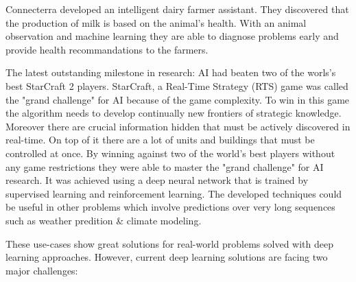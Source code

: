 Connecterra developed an intelligent dairy farmer assistant.
They discovered that the production of milk is based on the animal’s health.
With an animal observation and machine learning they are able to diagnose problems early and provide health recommandations to the farmers.
\cite{tensorflow-stories, connecterra-video, connecterra-web}

The latest outstanding milestone in research: AI had beaten two of the worls's best StarCraft 2 players.
StarCraft, a Real-Time Strategy (RTS) game was called the "grand challenge" for AI because of the game complexity.
To win in this game the algorithm needs to develop continually new frontiers of strategic knowledge.
Moreover there are crucial information hidden that must be actively discovered in real-time. On top of it there are a lot of units and buildings that must be controlled at once.
By winning against two of the world's best players without any game restrictions they were able to master the "grand challenge" for AI research.
It was achieved using a deep neural network that is trained by supervised learning and reinforcement learning.
The developed techniques could be useful in other problems which involve predictions over very long sequences such as weather predition \& climate modeling.
\cite{alphastar}

These use-cases show great solutions for real-world problems solved with deep learning approaches.
However, current deep learning solutions are facing two major challenges:

